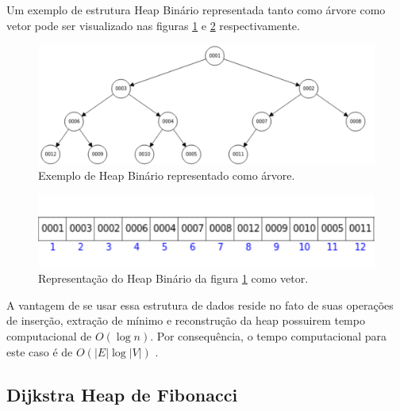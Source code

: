Um exemplo de estrutura Heap Binário representada tanto como árvore como vetor pode ser visualizado nas figuras \ref{fig-dijkstra-heapbinario} e \ref{fig-dijkstra-heapvetor} respectivamente.

\begin{figure}[H]
\centering
\includegraphics[width=.95\textwidth]{figuras/Heap} 
\caption{Exemplo de Heap Binário representado como árvore.}
\label{fig-dijkstra-heapbinario}
\end{figure}

\begin{figure}[H]
\centering
\includegraphics[width=.60\textwidth]{figuras/Heap-vetor}
\caption{Representação do Heap Binário da figura \ref{fig-dijkstra-heapbinario} como vetor.}
\label{fig-dijkstra-heapvetor}
\end{figure}

A vantagem de se usar essa estrutura de dados reside no fato de suas operações de inserção, extração de mínimo e reconstrução da heap possuirem tempo computacional de $O(\log n)$. Por consequência, o tempo computacional para este caso é de $O(|E| \log |V|)$ \cite{cormen2009introduction}.

\subsection{Dijkstra Heap de Fibonacci}
\label{sec-dijkstra-versoes-fibonacci}


